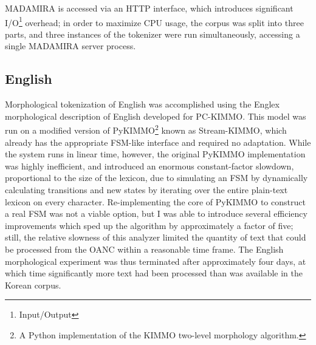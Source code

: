MADAMIRA is accessed via an HTTP interface, which introduces significant I/O\footnote{Input/Output} overhead; in order to maximize CPU usage, the corpus was split into three parts, and three instances of the tokenizer were run simultaneously, accessing a single MADAMIRA server process.

\subsection{English}
Morphological tokenization of English was accomplished using the Englex morphological description of English\cite{antworthenglex} developed for PC-KIMMO\cite{koskenniemi84}. This model was run on a modified version of PyKIMMO\footnote{A Python implementation of the KIMMO two-level morphology algorithm.} known as Stream-KIMMO\cite{kearsley13}, which already has the appropriate FSM-like interface and required no adaptation. While the system runs in linear time, however, the original PyKIMMO implementation was highly inefficient, and introduced an enormous constant-factor slowdown, proportional to the size of the lexicon, due to simulating an FSM by dynamically calculating transitions and new states by iterating over the entire plain-text lexicon on every character. Re-implementing the core of PyKIMMO to construct a real FSM was not a viable option, but I was able to introduce several efficiency improvements which sped up the algorithm by approximately a factor of five; still, the relative slowness of this analyzer limited the quantity of text that could be processed from the OANC within a reasonable time frame. The English morphological experiment was thus terminated after approximately four days, at which time significantly more text had been processed than was available in the Korean corpus.

